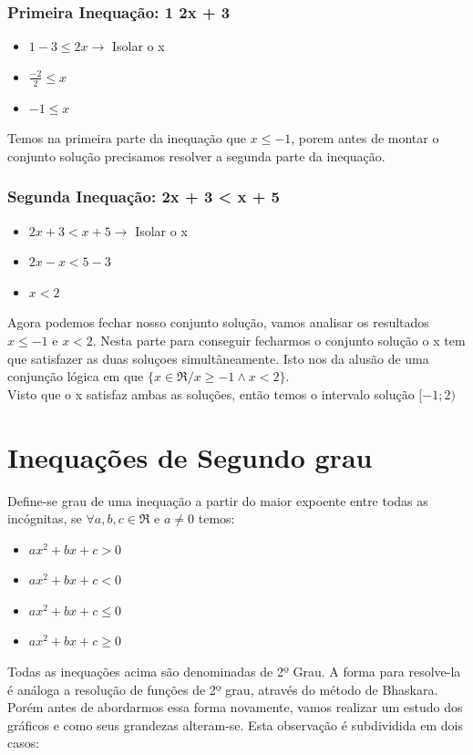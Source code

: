 \documentclass[a4paper,12pt,twoside,BCOR=10mm]{scrbook}
\begin{document}
\begin{titlepage}
\subsubsection{Primeira Inequação: 1 \leq 2x + 3}
\begin{itemize}
\item  $1 - 3 \leq 2x \rightarrow$ Isolar o x
\item  $ \frac{-2}{2} \leq x$ 
\item  $ -1 \leq x$
\end{itemize}
Temos na primeira parte da inequação que $x \leq -1$, porem antes de montar o conjunto solução precisamos resolver a segunda parte da inequação.
\subsubsection{Segunda Inequação: 2x + 3 < x + 5}
\begin{itemize}
\item  $2x + 3 < x + 5 \rightarrow$ Isolar o x
\item  $ 2x - x < 5 - 3$ 
\item  $ x < 2$
\end{itemize}
Agora podemos fechar nosso conjunto solução, vamos analisar os resultados $x \leq -1$ e $x < 2$. Nesta parte para conseguir fecharmos o conjunto solução o x tem que satisfazer as duas soluçoes simultâneamente. Isto nos da alusão de uma conjunção lógica em que $\{x \in \Re / x \geq -1 \wedge x < 2\}$.\\
Visto que o x satisfaz ambas as soluções, então temos o intervalo solução $[-1;2)$

\section{Inequações de Segundo grau}
Define-se grau de uma inequação a partir do maior expoente entre todas as incógnitas, se $\forall a,b,c \in \Re$ e $a \neq 0$  temos:
\begin{itemize}
\item $ax^{2} + bx + c > 0$
\item $ax^{2} + bx + c < 0$
\item $ax^{2} + bx + c \leq 0$
\item $ax^{2} + bx + c \geq 0$
\end{itemize}
Todas as inequações acima são denominadas de 2º Grau. A forma para resolve-la é análoga a resolução de funções de 2º grau, através do método de Bhaskara. Porém antes de abordarmos essa forma novamente, vamos realizar um estudo dos gráficos e como seus grandezas alteram-se. Esta observação é subdividida em dois casos:

\end{titlepage}
\end{document}
